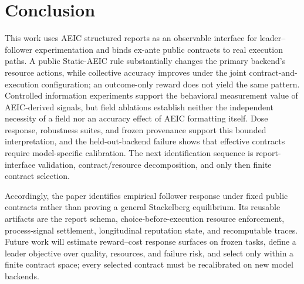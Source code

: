 \section{Conclusion}
\label{sec:conclusion}

This work uses AEIC structured reports as an observable interface for leader--follower experimentation and binds ex-ante public contracts to real execution paths. A public Static-AEIC rule substantially changes the primary backend's resource actions, while collective accuracy improves under the joint contract-and-execution configuration; an outcome-only reward does not yield the same pattern. Controlled information experiments support the behavioral measurement value of AEIC-derived signals, but field ablations establish neither the independent necessity of a field nor an accuracy effect of AEIC formatting itself. Dose response, robustness suites, and frozen provenance support this bounded interpretation, and the held-out-backend failure shows that effective contracts require model-specific calibration. The next identification sequence is report-interface validation, contract/resource decomposition, and only then finite contract selection.

Accordingly, the paper identifies empirical follower response under fixed public contracts rather than proving a general Stackelberg equilibrium. Its reusable artifacts are the report schema, choice-before-execution resource enforcement, process-signal settlement, longitudinal reputation state, and recomputable traces. Future work will estimate reward--cost response surfaces on frozen tasks, define a leader objective over quality, resources, and failure risk, and select only within a finite contract space; every selected contract must be recalibrated on new model backends.
